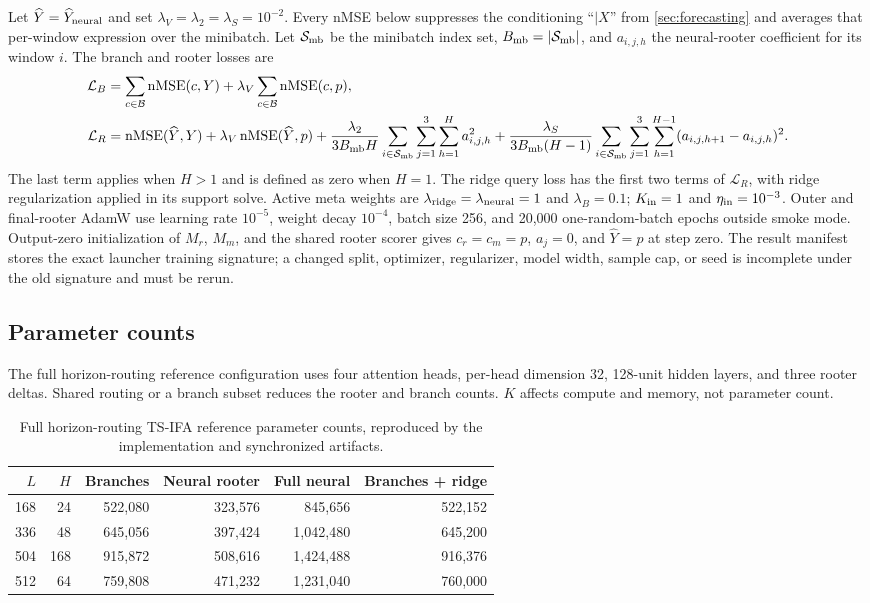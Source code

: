 \documentclass[10pt]{article}
\newcommand{\code}[1]{\texttt{\detokenize{#1}}}
\newcommand{\nMSE}{\operatorname{nMSE}}
\begin{document}
Let $\widehat Y=\widehat Y_{\rm neural}$ and set
$\lambda_V=\lambda_2=\lambda_S=10^{-2}$. Every nMSE below suppresses the
conditioning ``$\mid X$'' from \cref{sec:forecasting} and averages that
per-window expression over the minibatch. Let $\mathcal S_{\rm mb}$ be the
minibatch index set, $B_{\rm mb}=|\mathcal S_{\rm mb}|$, and
$a_{i,j,h}$ the neural-rooter coefficient for its window $i$. The branch and
rooter losses are
\begin{align}
 \mathcal L_B
 &=\sum_{c\in\mathcal B}\nMSE(c,Y)
 +\lambda_V\sum_{c\in\mathcal B}\nMSE(c,p),\\
 \mathcal L_R
 &=\nMSE(\widehat Y,Y)+\lambda_V\nMSE(\widehat Y,p)
 +\frac{\lambda_2}{3B_{\rm mb}H}
 \sum_{i\in\mathcal S_{\rm mb}}\sum_{j=1}^{3}\sum_{h=1}^H a_{i,j,h}^2
 +\frac{\lambda_S}{3B_{\rm mb}(H-1)}
 \sum_{i\in\mathcal S_{\rm mb}}\sum_{j=1}^{3}\sum_{h=1}^{H-1}
 (a_{i,j,h+1}-a_{i,j,h})^2.
\end{align}
The last term applies when $H>1$ and is defined as zero when $H=1$.
The ridge query loss has the first two terms of $\mathcal L_R$, with ridge
regularization applied in its support solve. Active meta weights are
$\lambda_{\rm ridge}=\lambda_{\rm neural}=1$ and $\lambda_B=0.1$;
$K_{\rm in}=1$ and $\eta_{\rm in}=10^{-3}$. Outer and final-rooter AdamW use
 learning rate $10^{-5}$, weight decay $10^{-4}$, batch size 256, and 20,000
one-random-batch epochs outside smoke mode.
Output-zero initialization of $M_r$, $M_m$, and the shared rooter scorer gives
$c_r=c_m=p$, $a_j=0$, and $\widehat Y=p$ at step zero.
The result manifest stores the exact launcher training signature; a changed
split, optimizer, regularizer, model width, sample cap, or seed is incomplete
under the old signature and must be rerun.
\fi

\subsection{Parameter counts}

The full horizon-routing reference configuration uses four attention heads,
per-head dimension 32, 128-unit hidden layers, and three rooter deltas. Shared
routing or a branch subset reduces the rooter and branch counts. $K$ affects
compute and memory, not parameter count.

\begin{table}[H]
\centering
\small
\caption{Full horizon-routing TS-IFA reference parameter counts, reproduced by
the implementation and synchronized \code{config.json} artifacts.}
\label{tab:tsifa-counts}
\begin{tabular}{@{}rrrrrr@{}}
\toprule
$L$ & $H$ & Branches & Neural rooter & Full neural & Branches + ridge \\
\midrule
168 & 24  & 522,080 & 323,576 & 845,656 & 522,152 \\
336 & 48  & 645,056 & 397,424 & 1,042,480 & 645,200 \\
504 & 168 & 915,872 & 508,616 & 1,424,488 & 916,376 \\
512 & 64  & 759,808 & 471,232 & 1,231,040 & 760,000 \\
\bottomrule
\end{tabular}
\end{table}
\end{document}

